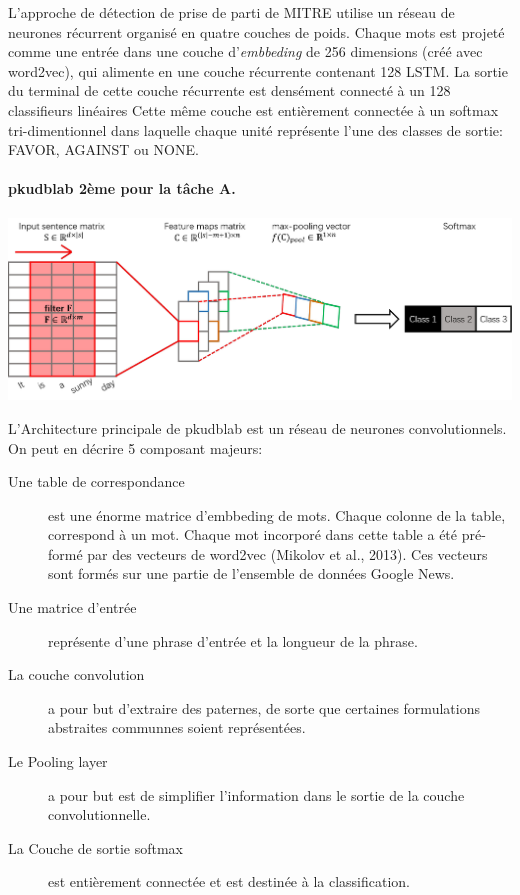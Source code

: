 \documentclass[onecolumn, 12pt]{article}
\begin{document}
L'approche de détection de prise de parti de MITRE utilise un réseau de neurones récurrent organisé en quatre couches de poids.
Chaque mots est projeté comme une entrée dans une couche d'\textit{embbeding} de 256 dimensions (créé avec word2vec), qui alimente en une couche récurrente contenant 128 LSTM.
La sortie du terminal
de cette couche récurrente est densément connecté à un 128 classifieurs linéaires
Cette même couche est entièrement connectée à un softmax tri-dimentionnel dans laquelle chaque unité représente l'une des classes de sortie: FAVOR, AGAINST ou NONE.

\paragraph{pkudblab 2ème pour la tâche A.}
\begin{center}
 \includegraphics[scale=0.25]{../../img/model/pkudblab/model.png}
 \label{pkudblab_model}
\end{center}
L'Architecture principale de pkudblab est un réseau de neurones convolutionnels.
On peut en décrire 5 composant majeurs:
\begin{description}
 \item[Une table de correspondance] est une énorme matrice d'embbeding de mots.
 Chaque colonne de la table, correspond à un mot.
 Chaque mot incorporé dans cette table a été pré-formé par des vecteurs de word2vec (Mikolov et al., 2013).
 Ces vecteurs sont formés sur une partie de l'ensemble de données Google News.
 \item[Une matrice d'entrée] représente d'une phrase d'entrée et la longueur de la phrase.
 \item[La couche convolution] a pour but d'extraire des paternes, de sorte que certaines formulations abstraites communnes soient représentées.
 \item[Le Pooling layer] a pour but est de simplifier l'information dans le
 sortie de la couche convolutionnelle.
 \item[La Couche de sortie softmax] est entièrement connectée et est destinée à la classification.
\end{description}
\end{document}
